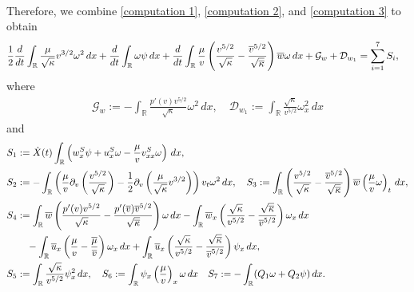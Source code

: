 \documentclass[11pt,reqno]{amsart}
\begin{document}
\begin{appendix}
\begin{equation}
\begin{aligned}
\end{aligned}
\end{equation}
Therefore, we combine \eqref{computation 1}, \eqref{computation 2}, and \eqref{computation 3} to obtain
\begin{equation*} %
\begin{aligned}
&\frac{1}{2} \frac{d}{dt} \int_\mathbb{R} \frac{\mu }{\sqrt{\kappa}}v^{3/2} \omega^2 \, dx +\frac{d}{dt} \int_\mathbb{R} \omega \psi \, dx +\frac{d}{dt}\int_\mathbb{R} \frac{\mu}{v}  \left(\frac{v^{5/2}}{\sqrt{\kappa}}-\frac{\ov^{5/2}}{\sqrt{\ok}}\right) \ow  \omega \, dx +\mathcal{G}_w +\mathcal{D}_{w_1} = \sum_{i=1}^{7} S_i, 
\end{aligned}
\end{equation*}
where
\begin{align*}
\mathcal{G}_w :=-\int_\mathbb{R}  \frac{p'(v) v^{5/2}}{\sqrt{\kappa}} \omega^2 \, dx,\quad\mathcal{D}_{w_1} :=  \int_\mathbb{R} \frac{\sqrt{\kappa}}{v^{5/2}} \omega_x^2 \, dx
\end{align*}
and
\begin{align*}
S_1 &:=\dot{X}(t)\int_\mathbb{R}  \left( w^S_x \psi + u^S_x \omega- \frac{\mu}{v}v^S_{xx}  \omega \right) \, dx,\\
S_2 &:= - \int_\mathbb{R}   \left( \frac{\mu}{v} \partial_v \left( \frac{v^{5/2}}{\sqrt{\kappa}} \right)-\frac{1}{2}  \partial_v \left( \frac{\mu }{\sqrt{\kappa}}v^{3/2} \right) \right) v_t \omega^2   \, dx,\quad S_3 := \int_\mathbb{R} \left(\frac{v^{5/2}}{\sqrt{\kappa}}-\frac{\overline{v}^{5/2}}{\sqrt{\overline{\kappa}}}\right) \overline{w}  \left(  \frac{\mu}{v} \omega \right)_t \, dx, \\ 
S_4 &:=  \int_\mathbb{R}  \overline{w} \left(  \frac{p'(v) v^{5/2}}{\sqrt{\kappa}}-\frac{p'(\overline{v})\overline{v}^{5/2}}{\sqrt{\overline{\kappa}}} \right) \omega  \, dx - \int_\mathbb{R}  \overline{w}_x \left( \frac{\sqrt{\kappa}}{v^{5/2}}-\frac{\sqrt{\overline{\kappa}}}{\overline{v}^{5/2}} \right) \omega_x  \, dx \\
&\quad - \int_\mathbb{R}  \overline{u}_x \left( \frac{\mu}{v}-\frac{\overline{\mu}}{\overline{v}} \right) \omega_x  \, dx + \int_\mathbb{R}  \overline{u}_x \left(\frac{\sqrt{\kappa}}{v^{5/2}}-\frac{\sqrt{\overline{\kappa}}}{\overline{v}^{5/2}} \right) \psi_x \, dx,\\ 
S_{5} &:=  \int_\mathbb{R} \frac{\sqrt{\kappa}}{v^{5/2}} \psi_x^2 \, dx, \quad S_{6} :=  \int_\mathbb{R} \psi_x \left( \frac{\mu}{v} \right)_x \omega  \, dx  \quad 
S_{7} := -\int_\mathbb{R} (Q_1 \omega + Q_2 \psi) \, dx. 
\end{align*}


\end{appendix}
\end{document}
